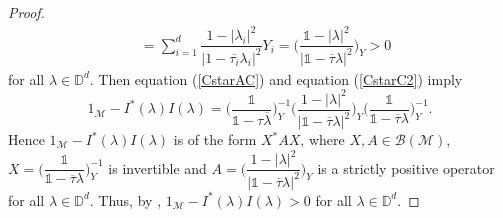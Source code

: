 \documentclass[11pt, reqno]{amsart}
\newcommand\1{\boldsymbol {1}}
\numberwithin{equation}{section}
\begin{document}
\begin{proof}
\begin{align}
&=\sum_{i=1}^{d}\dfrac{1-\lvert \lambda_{i} \rvert^{2}}{\lvert 1-\overline{\tau_{i}}\lambda_{i}\rvert^{2}}Y_{i}=\bigg(\dfrac{\mathds{1}-\lvert \lambda \rvert^{2}}{\lvert \mathds{1}-\overline{\tau}\lambda\rvert^{2}}\bigg)_{Y}>0\label{CstarC2}
\end{align}
for all $\lambda\in\mathbb{D}^{d}$. Then equation (\ref{CstarAC}) and equation (\ref{CstarC2}) imply 
$$1_{\mathcal{M}}-I^{*}(\lambda)I(\lambda)=\bigg(\dfrac{\mathds{1}}{\mathds{1}-\tau\overline{\lambda}}\bigg)_{Y}^{-1}
\bigg(\dfrac{1-\lvert \lambda \rvert^{2}}{\lvert \mathds{1}-\overline{\tau}\lambda\rvert^{2}}\bigg)_{Y}\bigg(\dfrac{\mathds{1}}{\mathds{1}-\overline{\tau}\lambda}\bigg)_{Y}^{-1}.$$
Hence $1_{\mathcal{M}}-I^{*}(\lambda)I(\lambda)$ is of the form $X^{*}AX$, where $X, A\in\mathcal{B(\mathcal{M})}$, $X=\bigg(\dfrac{\mathds{1}}{\mathds{1}-\overline{\tau}\lambda}\bigg)_{Y}^{-1} $ is invertible and $A= \bigg(\dfrac{1-\lvert \lambda \rvert^{2}}{\lvert \mathds{1}-\overline{\tau}\lambda\rvert^{2}}\bigg)_{Y}$ is a strictly positive operator for all $\lambda\in\mathbb{D}^{d}$. Thus, by \cite[Lemma 2.81]{AMYOperatorbook}, $1_{\mathcal{M}}-I^{*}(\lambda)I(\lambda)>0$ for all $\lambda\in\mathbb{D}^{d}$.


\end{proof}
\end{document}
